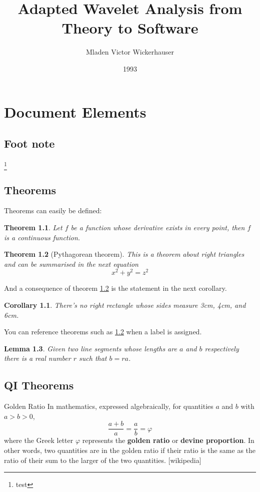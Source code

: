 \documentclass[11pt
              ,a4paper
              ,deepblue={hexagon(fg=primaryc,bg=primary,img=c3)}
              ]{SuperQIBook}
\title{Adapted Wavelet Analysis from\\ Theory to Software }
\subtitle{}
\author{Mladen Victor Wickerhauser }
\date{1993 }
\newcommand*{\sqbname}[1]{\textbf{\textcolor{complement}{#1}}}
\newtheorem{theorem}{Theorem}[section]
\newtheorem{corollary}{Corollary}[theorem]
\newtheorem{lemma}[theorem]{Lemma}
\begin{document}
\sqbtitlepage
\frontmatter
\tableofcontents
\mainmatter
\pagestyle{scrheadings}
\chapter{Document Elements}
\section{Foot note}
\footnote{test}

\section{Theorems}
Theorems can easily be defined:

\begin{theorem}
        Let \(f\) be a function whose derivative exists in every point, then \(f\) is
        a continuous function.
\end{theorem}

\begin{theorem}[Pythagorean theorem]
        \label{pythagorean}
        This is a theorem about right triangles and can be summarised in the next
        equation
        \[ x^2 + y^2 = z^2 \]
\end{theorem}

And a consequence of theorem \ref{pythagorean} is the statement in the next
corollary.

\begin{corollary}
        There's no right rectangle whose sides measure 3cm, 4cm, and 6cm.
\end{corollary}

You can reference theorems such as \ref{pythagorean} when a label is assigned.

\begin{lemma}
        Given two line segments whose lengths are \(a\) and \(b\) respectively there is a
        real number \(r\) such that \(b=ra\).
\end{lemma}

\section{QI Theorems}

\begin{qitheorem}{Golden Ratio}
        In mathematics, expressed algebraically, for quantities $a$ and $b$ with $a>b>0$,
        \begin{equation*}
                \frac{a+b}{a} = \frac{a}{b} = \varphi
        \end{equation*}
        where the Greek letter $\varphi$  represents the \sqbname{golden ratio} or \sqbname{devine proportion}.
        In other words, two quantities are in the golden ratio if their ratio is the same as the ratio of their
        sum to the larger of the two quantities. [wikipedia]
\end{qitheorem}
\end{document}
